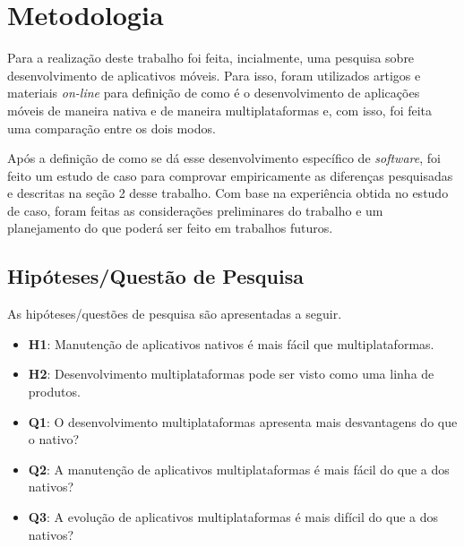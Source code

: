 \chapter{Metodologia} \label{metodologia}
Para a realização deste trabalho foi feita, incialmente, uma pesquisa sobre desenvolvimento de aplicativos móveis. 
Para isso, foram utilizados artigos e materiais \textit{on-line} para definição de como é o desenvolvimento
de aplicações móveis de maneira nativa e de maneira multiplataformas e, com isso, foi feita uma comparação 
entre os dois modos. 


Após a definição de como se dá esse desenvolvimento específico de \textit{software},
foi feito um estudo de caso para comprovar empiricamente as diferenças pesquisadas e descritas na seção 2 
desse trabalho. Com base na experiência obtida no estudo de caso, foram feitas as considerações preliminares
do trabalho e um planejamento do que poderá ser feito em trabalhos futuros.
\section{Hipóteses/Questão de Pesquisa} \label{subsec:hipoteses}

As hipóteses/questões de pesquisa são apresentadas a seguir.

\begin{itemize}
    \item \textbf{H1}: Manutenção de aplicativos nativos é mais fácil que multiplataformas.
    \item \textbf{H2}: Desenvolvimento multiplataformas pode ser visto como uma linha de produtos.
    \item \textbf{Q1}: O desenvolvimento multiplataformas apresenta mais desvantagens do que o nativo?
    \item \textbf{Q2}: A manutenção de aplicativos multiplataformas é mais fácil do que a dos nativos?
    \item \textbf{Q3}: A evolução de aplicativos multiplataformas é mais difícil do que a dos nativos? 
\end{itemize}

